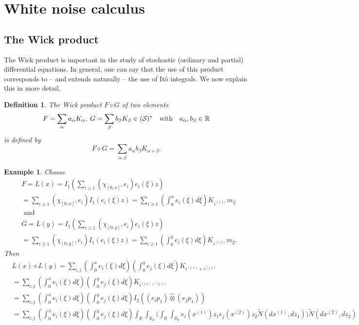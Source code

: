 \documentclass[12pt]{article}%
\newtheorem{definition}[theorem]{Definition}
\newtheorem{example}[theorem]{Example}
\numberwithin{equation}{section}
\def\R{\mathbb{R}}
\def\d{\diamond}
\def\d{\diamond}
\begin{document}
\section{White noise calculus}
\subsection{The Wick product}

The Wick product is important in the study of
stochastic (ordinary and partial) differential equations. In
general, one can say that the use of this product corresponds to
-- and extends naturally -- the use of It\^{o} integrals. We now
explain this in more detail.

\begin{definition}The {\it Wick product} $F\diamond G$ of two elements
$$F=\sum\limits_\alpha a_\alpha K_\alpha,\;G=\sum\limits_{\beta} b_{\beta}
K_{\beta}\in({\cal S})^*\quad\text{with}\quad
a_{\alpha},b_{\beta}\in\R$$
is defined by
$$F\d 
G=\sum\limits_{\alpha,\beta}a_{\alpha}b_{\beta}K_{\alpha+\beta}.$$
\end{definition}
\begin{example}
 Choose 
 \begin{align}
 &F=L(x)=I_{1}(\sum_{i\geq 1}(\chi_{[0,x]},e _{i})e _{i}(\xi)z)\\
&=\sum_{i\geq 1}(\chi_{[0,x]},e
_{i})I_{1}(e _{i}(\xi)z)=\sum_{i\geq 1}\left( \int_0^x e _{i}(\xi)d\xi\right)
K_{\varepsilon ^{(i,1)}}m_{2}\\
&\text{ and }\\
&G=L(y)=I_{1}(\sum_{i\geq 1}(\chi_{[0,y]},e _{i})e _{i}(\xi)z)\\
&=\sum_{i\geq 1}(\chi_{[0,y]},e
_{i})I_{1}(e _{i}(\xi)z)=\sum_{i\geq 1}\left( \int_0^y e _{i}(\xi)d\xi\right)
K_{\varepsilon ^{(i,1)}}m_{2}.  
\end{align}
Then
\begin{align*}
    &L(x) \diamond L(y)= \sum_{i,j} ( \int_0^x e _{i}(\xi)d\xi)( \int_0^y e _{j}(\xi)d\xi) K_{\epsilon^{(i,1)}+\epsilon ^{(j,1)}}\\
    &=\sum_{i,j} ( \int_0^x e _{i}(\xi)d\xi)( \int_0^y e _{j}(\xi)d\xi) K_{\epsilon^{(i.1)+(j,1)}}\\
    &=\sum_{i,j} ( \int_0^x e _{i}(\xi)d\xi)( \int_0^y e _{j}(\xi)d\xi)I_2((e_ip_1)\widehat{\otimes} (e_j p_1)) \\
    &=\sum_{i,j} ( \int_0^x e _{i}(\xi)d\xi)( \int_0^y e _{j}(\xi)d\xi)\int_{\R}\int_{\R_0} \Big(\int_{\R} \int_{\R_0} e_i(x^{(1)})z_1e_j(x^{(2)})z_2 \widetilde{N}(dx^{(1)},dz_1)\Big) \widetilde{N}(dx^{(2)},dz_2)
\end{align*}

\end{example}
\end{document}
